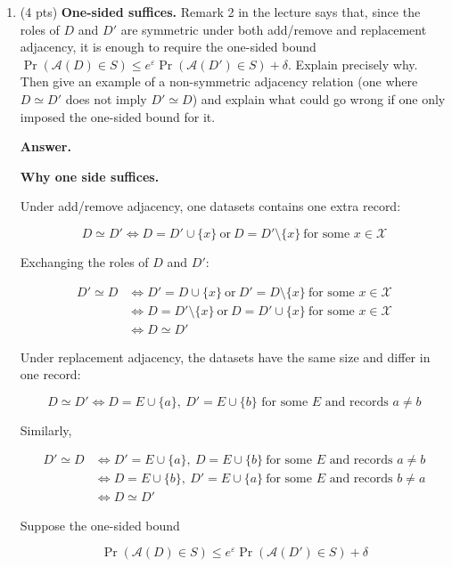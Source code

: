 \documentclass[11pt]{article}
\newcommand{\cA}{\mathcal{A}}
\newcommand{\eps}{\varepsilon}
\newenvironment{answer}{\par\medskip\noindent\textbf{Answer.}\ }{\par\bigskip}
\begin{document}
\begin{enumerate}

\item (4 pts) \textbf{One-sided suffices.} Remark 2 in the lecture says that,
since the roles of $D$ and $D'$ are symmetric under both add/remove and
replacement adjacency, it is enough to require the one-sided bound
$\Pr(\cA(D)\in S)\le e^{\eps}\Pr(\cA(D')\in S)+\delta$. Explain precisely
why. Then give an example of a non-symmetric adjacency relation (one where
$D\simeq D'$ does not imply $D'\simeq D$) and explain what could go wrong if
one only imposed the one-sided bound for it.

\begin{answer}

\textbf{Why one side suffices.}

Under add/remove adjacency, one datasets contains one extra record:

\[
  D \simeq D' \iff D = D' \cup \{x\}
  \ \text{or}\ D = D' \setminus \{x\}
  \ \text{for some } x \in \mathcal{X}
\]

Exchanging the roles of $D$ and $D'$:

\[
\begin{aligned}
D' \simeq D
&\iff D' = D \cup \{x\} \ \text{or}\ D' = D \setminus \{x\}
  \ \text{for some } x \in \mathcal{X} \\
&\iff D = D' \setminus \{x\} \ \text{or}\ D = D' \cup \{x\}
  \ \text{for some } x \in \mathcal{X} \\
&\iff D \simeq D'
\end{aligned}
\]

Under replacement adjacency, the datasets have the same size and differ in one record:

\[
  D \simeq D' \iff D = E\cup\{a\},\ D' = E\cup\{b\}
  \text{ for some } E \text{ and records } a\neq b
\]

Similarly,

\[
\begin{aligned}
D' \simeq D
&\iff D' = E\cup\{a\},\ D = E\cup\{b\}
  \ \text{for some } E \text{ and records } a\neq b \\
&\iff D = E\cup\{b\},\ D' = E\cup\{a\}
  \ \text{for some } E \text{ and records } b\neq a \\
&\iff D \simeq D'
\end{aligned}
\]

Suppose the one-sided bound

\[
  \Pr(\cA(D)\in S)\le e^{\eps}\Pr(\cA(D')\in S)+\delta
\]


\end{answer}
\end{enumerate}
\end{document}
